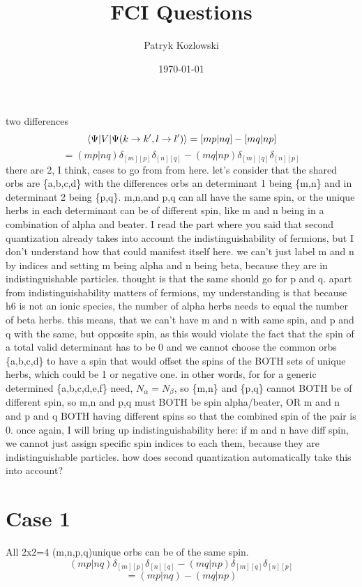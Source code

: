 \documentclass[12pt]{article}
\title{FCI Questions}
\author{Patryk Kozlowski}
\date{\today}
\begin{document}
\maketitle
two differences
\begin{equation}
    \mel{\Psi }{V}{\Psi (k\rightarrow k^{\prime}, l\rightarrow l^{\prime})}
    =[mp|nq]-[mq|np]
\end{equation}
\begin{equation}
    =(mp|nq)\delta _{[m][p]}\delta _{[n][q]}-(mq|np)\delta _{[m][q]}\delta _{[n][p]}
\end{equation}
 there are 2, I think, cases to go from from here. let's consider that the shared orbs are \{a,b,c,d\} with the differences orbs an determinant 1 being \{m,n\} and in determinant 2 being \{p,q\}. m,n,and p,q can all have the same spin, or the unique herbs in each determinant can be of different spin, like m and n being in a combination of alpha and beater. I read the part where you said that second quantization already takes into account the indistinguishability of fermions, but I don't understand how that could manifest itself here. we can't just label m and n by indices and setting m being alpha and n being beta, because they are in indistinguishable particles. thought is that the same should go for p and q. apart from indistinguishability matters of fermions, my understanding is that because h6 is not an ionic species, the number of alpha herbs needs to equal the number of beta herbs. this means, that we can't have m and n with same spin, and p and q with the same, but opposite spin, as this would violate the fact that the spin of a total valid determinant has to be 0 and we cannot choose the common orbs \{a,b,c,d\} to have a spin that would offset the spins of the  BOTH sets of unique herbs, which could be 1 or negative one. in other words, for for a generic determined \{a,b,c,d,e,f\} need, $N_{\alpha }=N_{\beta }$, so \{m,n\} and \{p,q\} cannot BOTH be of different spin, so m,n and p,q must BOTH be spin alpha/beater, OR m and n and p and q BOTH having different spins so that the combined spin of the pair is 0. once again, I will bring up indistinguishability here: if m and n have diff spin, we cannot just assign specific spin indices to each them, because they are indistinguishable particles. how does second quantization automatically take this into account? 
\section{Case 1}
All 2x2=4 (m,n,p,q)unique orbs can be of the same spin.
\begin{equation}
    (mp|nq)\delta _{[m][p]}\delta _{[n][q]}-(mq|np)\delta _{[m][q]}\delta _{[n][p]}
\end{equation}
\begin{equation}
    =(mp|nq)-(mq|np)
\end{equation}
\end{document}
